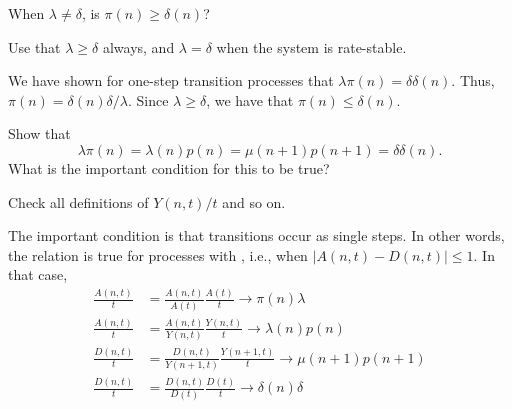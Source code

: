 \begin{exercise}
  When $\lambda\neq \delta$, is $\pi(n)\geq \delta(n)$?  
  \begin{hint}
Use that
    $\lambda \geq \delta$ always, and $\lambda=\delta$ when the system
    is rate-stable.
  \end{hint}
  \begin{solution}
    We have shown for one-step transition processes that
    $\lambda \pi(n) = \delta \delta(n)$. Thus,
    $\pi(n) = \delta(n)\delta /\lambda$. Since $\lambda\geq \delta$,
    we have that $\pi(n) \leq \delta(n)$.
  \end{solution}
\end{exercise}

\begin{exercise}
Show that 
\begin{equation*}
\lambda  \pi(n) = \lambda(n) p(n) = \mu(n+1) p(n+1) = \delta \delta(n).
\end{equation*}
What is the important condition for this to be true?
\begin{hint}
Check all definitions of $Y(n,t)/t$ and so on.
\end{hint}
\begin{solution}
  The important condition is that transitions occur as single
  steps. In other words, the relation is true for processes with
  , i.e., when $|A(n,t) - D(n,t)|\leq 1$.
  In  that case, 
\begin{align*}
  \frac{A(n,t)}{t} &=   \frac{A(n,t)}{A(t)} \frac{A(t)}{t} \to \pi(n) \lambda\\
  \frac{A(n,t)}{t} &=   \frac{A(n,t)}{Y(n,t)} \frac{Y(n,t)}{t} \to \lambda(n)p(n)\\
  \frac{D(n,t)}{t} &=   \frac{D(n,t)}{Y(n+1,t)} \frac{Y(n+1,t)}{t} \to \mu(n+1)p(n+1)\\
  \frac{D(n,t)}{t} &=   \frac{D(n,t)}{D(t)} \frac{D(t)}{t} \to \delta(n)\delta \\
\end{align*}
\end{solution}
\end{exercise}



